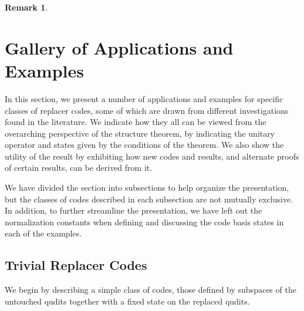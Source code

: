 \documentclass[11pt]{amsart}
\theoremstyle{definition}
\theoremstyle{definition}
\theoremstyle{definition}
\newtheorem{remark}[thm]{Remark}
\newcommand{\1}{\mathbb{I}}
\begin{document}
\begin{remark}
\end{remark}




\section{Gallery of Applications and Examples}\label{sec:gallery}

In this section, we present a number of applications and examples for specific classes of replacer codes, some of which are drawn from different investigations found in the literature. We indicate how they all can be viewed from the overarching perspective of the structure theorem, by indicating the unitary operator and states given by the conditions of the theorem. We also show the utility of the result by exhibiting how new codes and results, and alternate proofs of certain results, can be derived from it. 

We have divided the section into subsections to help organize the presentation, but the classes of codes described in each subsection are not mutually exclusive. In addition, to further streamline the presentation, we have left out the normalization constants when defining and discussing the code basis states in each of the examples. 



\subsection{Trivial Replacer Codes}
We begin by describing a simple class of codes, those defined by subspaces of the untouched qudits together with a fixed state on the replaced qudits. 
\end{document}
